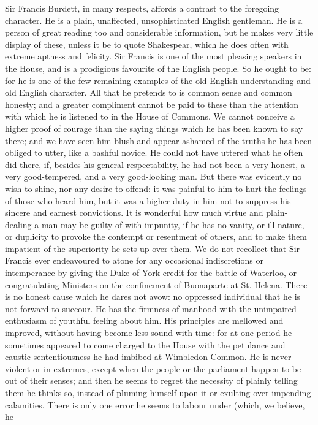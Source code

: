 Sir Francis Burdett, in many respects, affords a contrast to the
foregoing character. He is a plain, unaffected, unsophisticated
English gentleman. He is a person of great reading too and
considerable information, but he makes very little display of
these, unless it be to quote Shakespear, which he does often with
extreme aptness and felicity.  Sir Francis is one of the most
pleasing speakers in the House, and is a prodigious favourite of
the English people. So he ought to be: for he is one of the few
remaining examples of the old English understanding and old
English character. All that he pretends to is common sense and
common honesty; and a greater compliment cannot be paid to these
than the attention with which he is listened to in the House of
Commons. We cannot conceive a higher proof of courage than the
saying things which he has been known to say there; and we have
seen him blush and appear ashamed of the truths he has been
obliged to utter, like a bashful novice. He could not have uttered
what he often did there, if, besides his general respectability,
he had not been a very honest, a very good-tempered, and a very
good-looking man. But there was evidently no wish to shine, nor
any desire to offend: it was painful to him to hurt the feelings
of those who heard him, but it was a higher duty in him not to
suppress his sincere and earnest convictions. It is wonderful how
much virtue and plain-dealing a man may be guilty of with
impunity, if he has no vanity, or ill-nature, or duplicity to
provoke the contempt or resentment of others, and to make them
impatient of the superiority he sets up over them. We do not
recollect that Sir Francis ever endeavoured to atone for any
occasional indiscretions or intemperance by giving the Duke of
York credit for the battle of Waterloo, or congratulating
Ministers on the confinement of Buonaparte at St. Helena. There is
no honest cause which he dares not avow: no oppressed individual
that he is not forward to succour. He has the firmness of manhood
with the unimpaired enthusiasm of youthful feeling about him. His
principles are mellowed and improved, without having become less
sound with time: for at one period he sometimes appeared to come
charged to the House with the petulance and caustic
sententiousness he had imbibed at Wimbledon Common. He is never
violent or in extremes, except when the people or the parliament
happen to be out of their senses; and then he seems to regret the
necessity of plainly telling them he thinks so, instead of pluming
himself upon it or exulting over impending calamities. There is
only one error he seems to labour under (which, we believe, he
